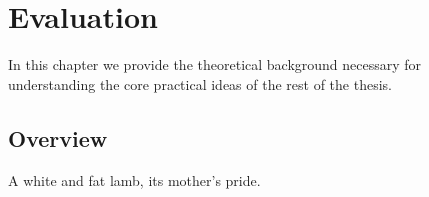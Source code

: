 \chapter{Evaluation} \label{chapter:evaluation}

In this chapter we provide the theoretical background necessary for
understanding the core practical ideas of the rest of the thesis.

\section{Overview} \label{section:evaluation_overview}

A white and fat lamb, its mother's pride.
